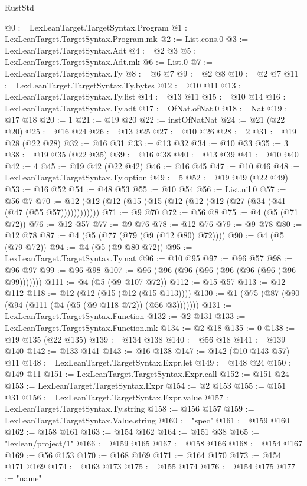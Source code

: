 \begin{lexlean}{RustStd}
\begin{coremodule}
@0 := LexLeanTarget.TargetSyntax.Program
@1 := LexLeanTarget.TargetSyntax.Program.mk
@2 := List.cons.{0}
@3 := LexLeanTarget.TargetSyntax.Adt
@4 := @2 @3
@5 := LexLeanTarget.TargetSyntax.Adt.mk
@6 := List.{0}
@7 := LexLeanTarget.TargetSyntax.Ty
@8 := @6 @7
@9 := @2 @8
@10 := @2 @7
@11 := LexLeanTarget.TargetSyntax.Ty.bytes
@12 := @10 @11
@13 := LexLeanTarget.TargetSyntax.Ty.list
@14 := @13 @11
@15 := @10 @14
@16 := LexLeanTarget.TargetSyntax.Ty.adt
@17 := OfNat.ofNat.{0}
@18 := Nat
@19 := @17 @18
@20 := 1
@21 := @19 @20
@22 := instOfNatNat
@24 := @21 (@22 @20)
@25 := @16 @24
@26 := @13 @25
@27 := @10 @26
@28 := 2
@31 := @19 @28 (@22 @28)
@32 := @16 @31
@33 := @13 @32
@34 := @10 @33
@35 := 3
@38 := @19 @35 (@22 @35)
@39 := @16 @38
@40 := @13 @39
@41 := @10 @40
@42 := 4
@45 := @19 @42 (@22 @42)
@46 := @16 @45
@47 := @10 @46
@48 := LexLeanTarget.TargetSyntax.Ty.option
@49 := 5
@52 := @19 @49 (@22 @49)
@53 := @16 @52
@54 := @48 @53
@55 := @10 @54
@56 := List.nil.{0}
@57 := @56 @7
@70 := @12 (@12 (@12 (@15 (@15 (@12 (@12 (@12 (@27 (@34 (@41 (@47 (@55 @57))))))))))))
@71 := @9 @70
@72 := @56 @8
@75 := @4 (@5 (@71 @72))
@76 := @12 @57
@77 := @9 @76
@78 := @12 @76
@79 := @9 @78
@80 := @12 @78
@87 := @4 (@5 (@77 (@79 (@9 (@12 @80) @72))))
@90 := @4 (@5 (@79 @72))
@94 := @4 (@5 (@9 @80 @72))
@95 := LexLeanTarget.TargetSyntax.Ty.nat
@96 := @10 @95
@97 := @96 @57
@98 := @96 @97
@99 := @96 @98
@107 := @96 (@96 (@96 (@96 (@96 (@96 (@96 (@96 @99)))))))
@111 := @4 (@5 (@9 @107 @72))
@112 := @15 @57
@113 := @12 @112
@118 := @12 (@12 (@15 (@12 (@15 @113))))
@130 := @1 (@75 (@87 (@90 (@94 (@111 (@4 (@5 (@9 @118 @72)) (@56 @3)))))))
@131 := LexLeanTarget.TargetSyntax.Function
@132 := @2 @131
@133 := LexLeanTarget.TargetSyntax.Function.mk
@134 := @2 @18
@135 := 0
@138 := @19 @135 (@22 @135)
@139 := @134 @138
@140 := @56 @18
@141 := @139 @140
@142 := @133 @141
@143 := @16 @138
@147 := @142 (@10 @143 @57) @11
@148 := LexLeanTarget.TargetSyntax.Expr.let
@149 := @148 @24
@150 := @149 @11
@151 := LexLeanTarget.TargetSyntax.Expr.call
@152 := @151 @24
@153 := LexLeanTarget.TargetSyntax.Expr
@154 := @2 @153
@155 := @151 @31
@156 := LexLeanTarget.TargetSyntax.Expr.value
@157 := LexLeanTarget.TargetSyntax.Ty.string
@158 := @156 @157
@159 := LexLeanTarget.TargetSyntax.Value.string
@160 := "spec"
@161 := @159 @160
@162 := @158 @161
@163 := @154 @162
@164 := @151 @38
@165 := "lexlean/project/1"
@166 := @159 @165
@167 := @158 @166
@168 := @154 @167
@169 := @56 @153
@170 := @168 @169
@171 := @164 @170
@173 := @154 @171 @169
@174 := @163 @173
@175 := @155 @174
@176 := @154 @175
@177 := "name"

\end{coremodule}
\end{lexlean}
